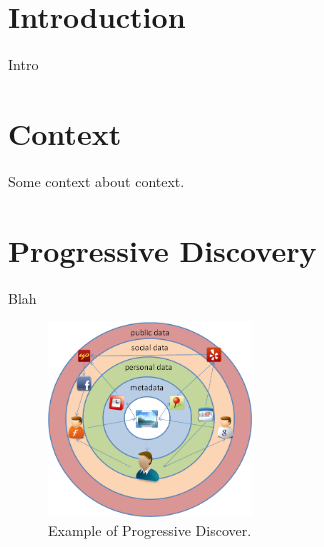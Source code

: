 \documentclass{sig-alternate}
\begin{document}
\section{Introduction}
Intro

\section{Context}
Some context about context.

\section{Progressive Discovery}
Blah \cite{westermann2007toward, gupta2011managing}



\begin{figure}[t]
\centering
\includegraphics[width=0.48\textwidth]{media/prog-discovery.png}
\caption{Example of Progressive Discover.}
\label{fig:cuenet-arch}
\end{figure}



\end{document}
